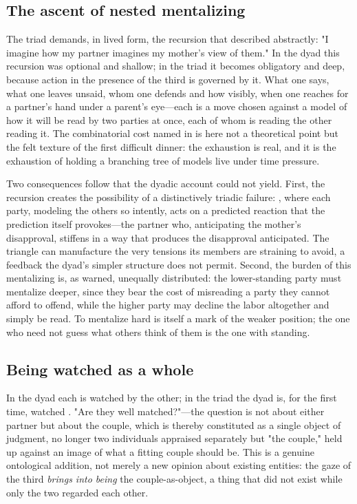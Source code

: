\subsection{The ascent of nested mentalizing}
The triad demands, in lived form, the recursion that  described abstractly: "I imagine how my partner imagines my mother's view of them." In the dyad this recursion was optional and shallow; in the triad it becomes obligatory and deep, because action in the presence of the third is governed by it. What one says, what one leaves unsaid, whom one defends and how visibly, when one reaches for a partner's hand under a parent's eye---each is a move chosen against a model of how it will be read by two parties at once, each of whom is reading the other reading it. The combinatorial cost named in  is here not a theoretical point but the felt texture of the first difficult dinner: the exhaustion is real, and it is the exhaustion of holding a branching tree of models live under time pressure.

Two consequences follow that the dyadic account could not yield. First, the recursion creates the possibility of a distinctively triadic failure: , where each party, modeling the others so intently, acts on a predicted reaction that the prediction itself provokes---the partner who, anticipating the mother's disapproval, stiffens in a way that produces the disapproval anticipated. The triangle can manufacture the very tensions its members are straining to avoid, a feedback the dyad's simpler structure does not permit. Second, the burden of this mentalizing is, as  warned, unequally distributed: the lower-standing party must mentalize deeper, since they bear the cost of misreading a party they cannot afford to offend, while the higher party may decline the labor altogether and simply be read. To mentalize hard is itself a mark of the weaker position; the one who need not guess what others think of them is the one with standing.

\subsection{Being watched as a whole}
In the dyad each is watched by the other; in the triad the dyad is, for the first time, watched . "Are they well matched?"---the question is not about either partner but about the couple, which is thereby constituted as a single object of judgment, no longer two individuals appraised separately but "the couple," held up against an image of what a fitting couple should be. This is a genuine ontological addition, not merely a new opinion about existing entities: the gaze of the third \emph{brings into being} the couple-as-object, a thing that did not exist while only the two regarded each other.


